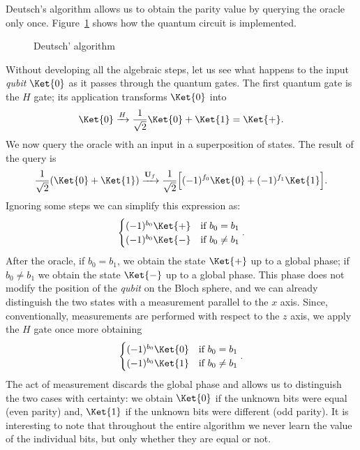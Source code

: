 Deutsch's algorithm allows us to obtain the parity value by querying the oracle only once. Figure~\ref{fig:deutsch} shows how the quantum circuit is implemented.
\begin{figure}[h]
	\centering
	\vspace{-.1cm}
	\caption{Deutsch' algorithm}
	\label{fig:deutsch}
\end{figure}

Without developing all the algebraic steps, let us see what happens to the input \emph{qubit} $\Ket{0}$ as it passes through the quantum gates. The first quantum gate is the $H$ gate; its application transforms $\Ket{0}$ into
\[
\Ket{0} \xrightarrow{H} \frac{1}{\sqrt{2}}\Ket{0} + \Ket{1} = \Ket{+}.
\]
We now query the oracle with an input in a superposition of states. The result of the query is
\[
\frac{1}{\sqrt{2}}(\Ket{0} + \Ket{1}) \xrightarrow{\mathbf{U}_f} \frac{1}{\sqrt{2}}\Big[(-1)^{f_0}\Ket{0} + (-1)^{f_1}\Ket{1}\Big].
\]
Ignoring some steps we can simplify this expression as:
\[
\begin{cases}
	(-1)^{b_0} \Ket{+} & \text{if } b_0=b_1\\
	(-1)^{b_0} \Ket{-} & \text{if } b_0\neq b_1
\end{cases}.
\]
After the oracle, if $ b_0=b_1$, we obtain the state $\Ket{+}$ up to a global phase; if $ b_0\neq b_1$ we obtain the state $\Ket{-}$ up to a global phase. This phase does not modify the position of the \emph{qubit} on the Bloch sphere, and we can already distinguish the two states with a measurement parallel to the $x$ axis. Since, conventionally, measurements are performed with respect to the $z$ axis, we apply the $H$ gate once more obtaining
\[
\begin{cases}
	(-1)^{b_0} \Ket{0} & \text{if } b_0=b_1\\
	(-1)^{b_0} \Ket{1} & \text{if } b_0\neq b_1
\end{cases}.
\]
The act of measurement discards the global phase and allows us to distinguish the two cases with certainty: we obtain $\Ket{0}$ if the unknown bits were equal (even parity) and, $\Ket{1}$ if the unknown bits were different (odd parity). It is interesting to note that throughout the entire algorithm we never learn the value of the individual bits, but only whether they are equal or not.

